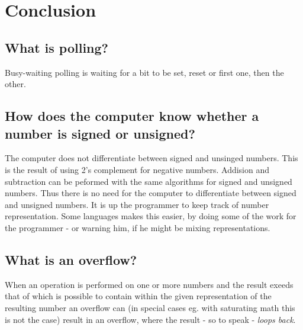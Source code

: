 \section{Conclusion}

\subsection{What is polling?}
Busy-waiting polling is waiting for a bit to be set, reset or first one, then
the other.

\subsection{How does the computer know whether a number is signed or unsigned?}
The computer does not differentiate between signed and unsinged numbers. This is
the result of using 2's complement for negative numbers. Addision and
subtraction can be peformed with the same algorithms for signed and unsigned
numbers. Thus there is no need for the computer to differentiate between signed
and unsigned numbers. It is up the programmer to keep track of number representation.
Some languages makes this easier, by doing some of the work for the programmer - or warning him, if he might be mixing representations.

\subsection{What is an overflow?}
When an operation is performed on one or more numbers and the result exeeds that
of which is possible to contain within the given representation of the resulting
number an overflow can (in special cases eg. with saturating math this is not
the case) result in an overflow, where the result - so to speak - \emph{loops
back}.
